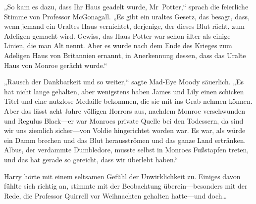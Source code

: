 „So kam es dazu, dass Ihr Haus geadelt wurde, Mr~Potter,“ sprach die feierliche Stimme von Professor McGonagall. „Es gibt ein uraltes Gesetz, das besagt, dass, wenn jemand ein Uraltes Haus vernichtet, derjenige, der dieses Blut rächt, zum Adeligen gemacht wird. Gewiss, das Haus Potter war schon älter als einige Linien, die man Alt nennt. Aber es wurde nach dem Ende des Krieges zum Adeligen Haus von Britannien ernannt, in Anerkennung dessen, dass das Uralte Haus von Monroe gerächt wurde.“

„Rausch der Dankbarkeit und so weiter,“ sagte Mad-Eye Moody säuerlich. „Es hat nicht lange gehalten, aber wenigstens haben James und Lily einen schicken Titel und eine nutzlose Medaille bekommen, die sie mit ins Grab nehmen können. Aber das lässt acht Jahre völligen Horrors aus, nachdem Monroe verschwunden und Regulus Black—er war Monroes private Quelle bei den Todessern, da sind wir uns ziemlich sicher—von Voldie hingerichtet worden war. Es war, als würde ein Damm brechen und das Blut herausströmen und das ganze Land ertränken. Albus, der verdammte Dumbledore, musste selbst in Monroes Fußstapfen treten, und das hat gerade so gereicht, dass wir überlebt haben.“

Harry hörte mit einem seltsamen Gefühl der Unwirklichkeit zu. Einiges davon fühlte sich richtig an, stimmte mit der Beobachtung überein—besonders mit der Rede, die Professor Quirrell vor Weihnachten gehalten hatte—und doch…

